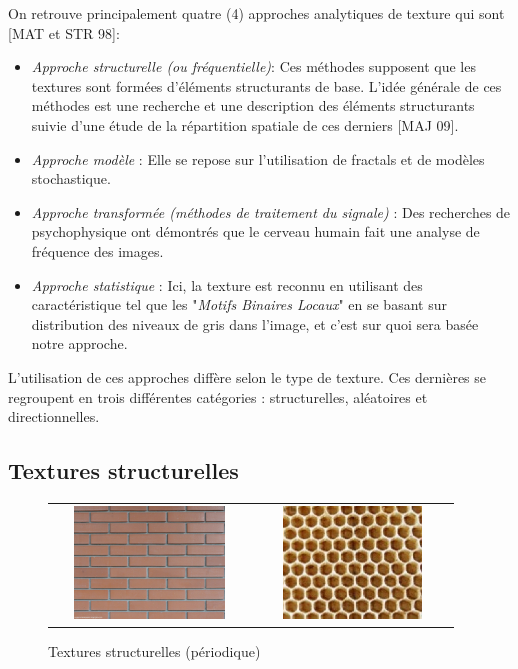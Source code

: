 \indent On retrouve principalement quatre (4) approches analytiques de texture qui sont [MAT et STR 98]:\\
\begin{itemize}
\item \textit{Approche structurelle (ou fréquentielle)}: Ces méthodes supposent que les textures sont formées d’éléments structurants de base. L’idée générale de ces méthodes est une recherche et une description des éléments structurants suivie d’une étude de la répartition spatiale de ces derniers [MAJ 09].\\

\item \textit{Approche modèle} : Elle se repose sur l’utilisation de fractals et de modèles stochastique.\\

\item \textit{Approche transformée (méthodes de traitement du signale)} : Des recherches de  psychophysique ont démontrés que le cerveau humain fait une analyse de fréquence des images.\\ 

\item \textit{Approche statistique} : Ici, la texture est reconnu en utilisant des caractéristique tel que les "\textit{Motifs Binaires Locaux}"  en se basant sur distribution des niveaux de gris dans l’image, et c’est sur quoi sera basée notre approche.\\
\end{itemize}

L’utilisation de ces approches diffère selon le type de texture. Ces dernières se regroupent en trois différentes catégories : structurelles, aléatoires et directionnelles.


\subsection{Textures structurelles}

\begin{figure}[htbp]
\centering
\begin{tabular}{cc}
\centering

	\includegraphics[width=5cm,height=3cm]{Figures/chap1/mur.jpg}	
&
	\includegraphics[width=5cm,height=3cm]{Figures/chap1/beehive.png}	

\end{tabular}
	\caption[textureStruc]{Textures structurelles (périodique)}
\label{fig:textureStruc}
\end{figure}


